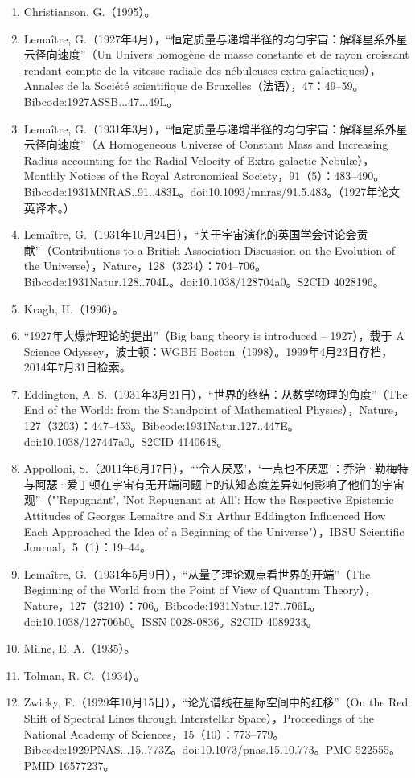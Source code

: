 \begin{enumerate}
\item Christianson, G.（1995）。  
\item Lemaître, G.（1927年4月），“恒定质量与递增半径的均匀宇宙：解释星系外星云径向速度”（Un Univers homogène de masse constante et de rayon croissant rendant compte de la vitesse radiale des nébuleuses extra-galactiques），Annales de la Société scientifique de Bruxelles（法语），47：49–59。Bibcode:1927ASSB...47...49L。  
\item Lemaître, G.（1931年3月），“恒定质量与递增半径的均匀宇宙：解释星系外星云径向速度”（A Homogeneous Universe of Constant Mass and Increasing Radius accounting for the Radial Velocity of Extra-galactic Nebulæ），Monthly Notices of the Royal Astronomical Society，91（5）：483–490。Bibcode:1931MNRAS..91..483L。doi:10.1093/mnras/91.5.483。（1927年论文英译本。）  
\item Lemaître, G.（1931年10月24日），“关于宇宙演化的英国学会讨论会贡献”（Contributions to a British Association Discussion on the Evolution of the Universe），Nature，128（3234）：704–706。Bibcode:1931Natur.128..704L。doi:10.1038/128704a0。S2CID 4028196。  
\item Kragh, H.（1996）。  
\item “1927年大爆炸理论的提出”（Big bang theory is introduced – 1927），载于 A Science Odyssey，波士顿：WGBH Boston（1998）。1999年4月23日存档，2014年7月31日检索。  
\item Eddington, A. S.（1931年3月21日），“世界的终结：从数学物理的角度”（The End of the World: from the Standpoint of Mathematical Physics），Nature，127（3203）：447–453。Bibcode:1931Natur.127..447E。doi:10.1038/127447a0。S2CID 4140648。
\item Appolloni, S.（2011年6月17日），“‘令人厌恶’，‘一点也不厌恶’：乔治·勒梅特与阿瑟·爱丁顿在宇宙有无开端问题上的认知态度差异如何影响了他们的宇宙观”（"'Repugnant', 'Not Repugnant at All': How the Respective Epistemic Attitudes of Georges Lemaître and Sir Arthur Eddington Influenced How Each Approached the Idea of a Beginning of the Universe"），IBSU Scientific Journal，5（1）：19–44。  
\item Lemaître, G.（1931年5月9日），“从量子理论观点看世界的开端”（The Beginning of the World from the Point of View of Quantum Theory），Nature，127（3210）：706。Bibcode:1931Natur.127..706L。doi:10.1038/127706b0。ISSN 0028-0836。S2CID 4089233。  
\item Milne, E. A.（1935）。  
\item Tolman, R. C.（1934）。  
\item Zwicky, F.（1929年10月15日），“论光谱线在星际空间中的红移”（On the Red Shift of Spectral Lines through Interstellar Space），Proceedings of the National Academy of Sciences，15（10）：773–779。Bibcode:1929PNAS...15..773Z。doi:10.1073/pnas.15.10.773。PMC 522555。PMID 16577237。  

\end{enumerate}

